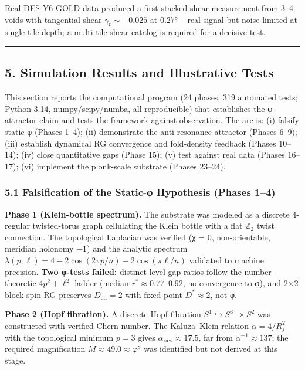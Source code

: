 \documentclass[
]{article}
\begin{document}
Real DES Y6 GOLD data produced a first stacked shear measurement from
3--4 voids with tangential shear \(\gamma_t \sim -0.025\) at \(0.27°\)
-- real signal but noise-limited at single-tile depth; a multi-tile
shear catalog is required for a decisive test.

\begin{center}\rule{0.5\linewidth}{0.5pt}\end{center}

\subsection{5. Simulation Results and Illustrative
Tests}\label{simulation-results-and-illustrative-tests}

This section reports the computational program (24 phases, 319 automated
tests; Python 3.14, numpy/scipy/numba, all reproducible) that
establishes the φ-attractor claim and tests the framework against
observation. The arc is: (i) falsify static φ (Phases 1--4); (ii)
demonstrate the anti-resonance attractor (Phases 6--9); (iii) establish
dynamical RG convergence and fold-density feedback (Phases 10--14); (iv)
close quantitative gaps (Phase 15); (v) test against real data (Phases
16--17); (vi) implement the plonk-scale substrate (Phases 23--24).

\subsubsection{5.1 Falsification of the Static-φ Hypothesis (Phases
1--4)}\label{falsification-of-the-static-ux3c6-hypothesis-phases-14}

\textbf{Phase 1 (Klein-bottle spectrum).} The substrate was modeled as a
discrete 4-regular twisted-torus graph cellulating the Klein bottle with
a flat \(\mathbb{Z}_2\) twist connection. The topological Laplacian was
verified (χ = 0, non-orientable, meridian holonomy −1) and the analytic
spectrum \(\lambda(p,\ell) = 4 - 2\cos(2\pi p/n) - 2\cos(\pi\ell/n)\)
validated to machine precision. \textbf{Two φ-tests failed:}
distinct-level gap ratios follow the number-theoretic \(4p^2 + \ell^2\)
ladder (median \(r^* \approx 0.77\)--0.92, no convergence to φ), and 2×2
block-spin RG preserves \(D_{\text{eff}} = 2\) with fixed point
\(D^* \approx 2\), not φ.

\textbf{Phase 2 (Hopf fibration).} A discrete Hopf fibration
\(S^1 \hookrightarrow S^3 \twoheadrightarrow S^2\) was constructed with
verified Chern number. The Kaluza--Klein relation \(\alpha = 4/R_f^2\)
with the topological minimum \(p = 3\) gives
\(\alpha_{\text{raw}} \approx 17.5\), far from
\(\alpha^{-1} \approx 137\); the required magnification
\(M \approx 49.0 \approx \varphi^8\) was identified but not derived at
this stage.
\end{document}

